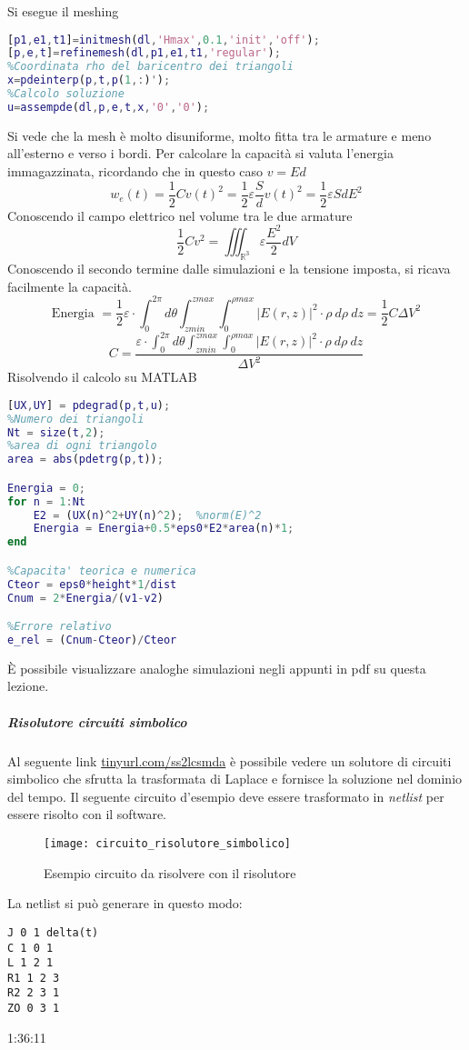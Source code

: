 Si esegue il meshing
\begin{lstlisting}[style=Matlab-editor,language = Matlab]
[p1,e1,t1]=initmesh(dl,'Hmax',0.1,'init','off');
[p,e,t]=refinemesh(dl,p1,e1,t1,'regular');
%Coordinata rho del baricentro dei triangoli
x=pdeinterp(p,t,p(1,:)');
%Calcolo soluzione
u=assempde(dl,p,e,t,x,'0','0');
\end{lstlisting}
Si vede che la mesh è molto disuniforme, molto fitta tra le armature e meno
all'esterno e verso i bordi. Per calcolare la capacità si valuta l'energia
immagazzinata, ricordando che in questo caso $v=Ed$
$$
w_e(t) = \frac{1}{2}Cv(t)^2 = \frac{1}{2}\varepsilon\frac{S}{d}v(t)^2 = 
\frac{1}{2}\varepsilon SdE^2
$$
Conoscendo il campo elettrico nel volume tra le due armature
$$
\frac{1}{2}Cv^2 = \iiint_{\mathbb{R}^3}\varepsilon \frac{E^2}{2}dV
$$
Conoscendo il secondo termine dalle simulazioni e la tensione imposta, si ricava
facilmente la capacità.
$$
\text{Energia } = \frac{1}{2}\varepsilon\cdot\int_0^{2\pi} d\theta 
\int_{zmin}^{zmax}\int_0^{\rho max} \left|E(r,z)\right|^2\cdot \rho\ d\rho\ dz =
\frac{1}{2}C\Delta V^2
$$
$$
C = \frac{\varepsilon\cdot \int_0^{2\pi} d\theta 
\int_{zmin}^{zmax}\int_0^{\rho max} \left|E(r,z)\right|^2\cdot \rho\ d\rho\ dz}{\Delta V^2}
$$
Risolvendo il calcolo su MATLAB
\begin{lstlisting}[style=Matlab-editor,language = Matlab]
[UX,UY] = pdegrad(p,t,u);
%Numero dei triangoli
Nt = size(t,2);
%area di ogni triangolo
area = abs(pdetrg(p,t));    

Energia = 0;
for n = 1:Nt     
    E2 = (UX(n)^2+UY(n)^2);  %norm(E)^2
    Energia = Energia+0.5*eps0*E2*area(n)*1;
end

%Capacita' teorica e numerica
Cteor = eps0*height*1/dist
Cnum = 2*Energia/(v1-v2)

%Errore relativo
e_rel = (Cnum-Cteor)/Cteor
\end{lstlisting}
È possibile visualizzare analoghe simulazioni negli appunti in pdf
su questa lezione.

\subparagraph{Risolutore circuiti simbolico}
Al seguente link \href{http://143.225.92.177:54323/}{tinyurl.com/ss2lcsmda}
è possibile vedere un solutore di circuiti simbolico che sfrutta la 
trasformata di Laplace e fornisce la soluzione nel dominio del tempo.
Il seguente circuito d'esempio deve essere trasformato in \textit{netlist} per 
essere risolto con il software.
\begin{figure}[H]
\centering
\texttt{[image: circuito\_risolutore\_simbolico]}
\caption{Esempio circuito da risolvere con il risolutore}
\end{figure}
La netlist si può generare in questo modo:
\begin{lstlisting}
J 0 1 delta(t)
C 1 0 1
L 1 2 1
R1 1 2 3
R2 2 3 1
ZO 0 3 1
\end{lstlisting}
1:36:11

